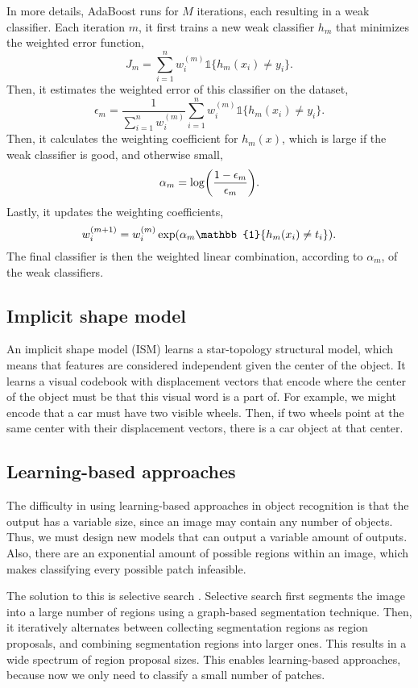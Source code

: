 In more details, AdaBoost \citep{freund1996experiments} runs for $M$
iterations, each resulting in a weak classifier. Each iteration $m$, it first
trains a new weak classifier $h_m$ that minimizes the weighted error function,
\[
    J_m = \sum_{i=1}^n w_i^{(m)} \mathbb{1} \{ h_m(x_i) \neq y_i \}.
\]
Then, it estimates the weighted error of this classifier on the dataset, \[
    \epsilon_m = \frac{1}{\sum_{i=1}^n w_i^{(m)}} \sum_{i=1}^n w_i^{(m)} \mathbb{1} \{ h_m(x_i) \neq y_i \}.
\]
Then, it calculates the weighting coefficient for $h_m(x)$, which is large if
the weak classifier is good, and otherwise small, \[
    \alpha_m = \log \lft( \frac{1 - \epsilon_m}{\epsilon_m} \rgt).
\]
Lastly, it updates the weighting coefficients, \[
    w_i^{(m+1)} = w_i^{(m)} \exp\lft( \alpha_m \mathbb{1} \{ h_m(x_i) \neq t_i \} \rgt).
\]
The final classifier is then the weighted linear combination, according to
$\alpha_m$, of the weak classifiers.

\subsection{Implicit shape model}

An implicit shape model (ISM) learns a star-topology structural model, which
means that features are considered independent given the center of the object.
It learns a visual codebook with displacement vectors that encode where the
center of the object must be that this visual word is a part of. For example,
we might encode that a car must have two visible wheels. Then, if two wheels
point at the same center with their displacement vectors, there is a car object
at that center.

\subsection{Learning-based approaches}

The difficulty in using learning-based approaches in object recognition is that
the output has a variable size, since an image may contain any number of
objects. Thus, we must design new models that can output a variable amount of
outputs. Also, there are an exponential amount of possible regions within an
image, which makes classifying every possible patch infeasible.

The solution to this is selective search \citep{uijlings2013selective}.
Selective search first segments the image into a large number of regions using
a graph-based segmentation technique. Then, it iteratively alternates between
collecting segmentation regions as region proposals, and combining segmentation
regions into larger ones. This results in a wide spectrum of region proposal
sizes. This enables learning-based approaches, because now we only need to
classify a small number of patches.


